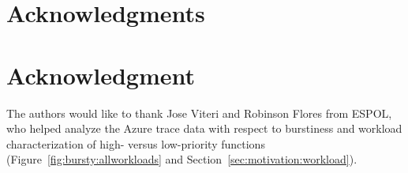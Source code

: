 \documentclass[compsoc]{IEEEtran}
\begin{document}
\begin{abstract}
  
\end{abstract}














%









\ifCLASSOPTIONcompsoc
  \section*{Acknowledgments}
\else
  \section*{Acknowledgment}
\fi
The authors would like to thank Jose Viteri and Robinson Flores from ESPOL, who helped analyze the Azure trace data with respect to burstiness and workload characterization of high- versus low-priority functions (Figure~\ref{fig:bursty:allworkloads} and Section~\ref{sec:motivation:workload}).


{


%
}


\end{document}
